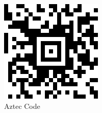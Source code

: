 \begin{figure}[h]
    \centering
    \includegraphics[scale=0.5]{figures/184px-Azteccodeexample.svg.png}
    \caption{Aztec Code}
    \label{fig:aztec}
\end{figure}